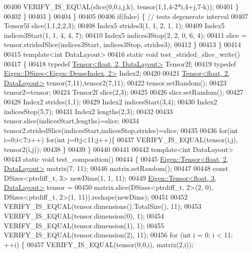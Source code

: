 \begin{DoxyCode}
00400           VERIFY\_IS\_EQUAL(slice(0,0,i,j,k), tensor(1,1,4-2*i,4+j,7-k));
00401         \}
00402       \}
00403     \}
00404   \}
00405 
00406   \textcolor{keywordflow}{if}(\textcolor{keyword}{false}) \{ \textcolor{comment}{// tests degenerate interval}
00407     Tensor5f slice(1,1,2,2,3);
00408     Index5 strides3(1, 1, 2, 1, 1);
00409     Index5 indices3Start(1, 1, 4, 4, 7);
00410     Index5 indices3Stop(2, 2, 0, 6, 4);
00411     slice = tensor.stridedSlice(indices3Start, indices3Stop, strides3);
00412   \}
00413 \}
00414 
00415 \textcolor{keyword}{template}<\textcolor{keywordtype}{int} DataLayout>
00416 \textcolor{keyword}{static} \textcolor{keywordtype}{void} test\_strided\_slice\_write()
00417 \{
00418   \textcolor{keyword}{typedef} \hyperlink{class_eigen_1_1_tensor}{Tensor<float, 2, DataLayout>} Tensor2f;
00419   \textcolor{keyword}{typedef} \hyperlink{struct_eigen_1_1_d_sizes}{Eigen::DSizes<Eigen::DenseIndex, 2>} Index2;
00420 
00421   \hyperlink{class_eigen_1_1_tensor}{Tensor<float, 2, DataLayout>} tensor(7,11),tensor2(7,11);
00422   tensor.setRandom();
00423   tensor2=tensor;
00424   Tensor2f slice(2,3);
00425 
00426   slice.setRandom();
00427 
00428   Index2 strides(1,1);
00429   Index2 indicesStart(3,4);
00430   Index2 indicesStop(5,7);
00431   Index2 lengths(2,3);
00432 
00433   tensor.slice(indicesStart,lengths)=slice;
00434   tensor2.stridedSlice(indicesStart,indicesStop,strides)=slice;
00435 
00436   \textcolor{keywordflow}{for}(\textcolor{keywordtype}{int} i=0;i<7;i++) \textcolor{keywordflow}{for}(\textcolor{keywordtype}{int} j=0;j<11;j++)\{
00437     VERIFY\_IS\_EQUAL(tensor(i,j), tensor2(i,j));
00438   \}
00439 \}
00440 
00441 
00442 \textcolor{keyword}{template}<\textcolor{keywordtype}{int} DataLayout>
00443 \textcolor{keyword}{static} \textcolor{keywordtype}{void} test\_composition()
00444 \{
00445   \hyperlink{class_eigen_1_1_tensor}{Eigen::Tensor<float, 2, DataLayout>} matrix(7, 11);
00446   matrix.setRandom();
00447 
00448   \textcolor{keyword}{const} DSizes<ptrdiff\_t, 3> newDims(1, 1, 11);
00449   \hyperlink{class_eigen_1_1_tensor}{Eigen::Tensor<float, 3, DataLayout>} tensor =
00450       matrix.slice(DSizes<ptrdiff\_t, 2>(2, 0), DSizes<ptrdiff\_t, 2>(1, 11)).reshape(newDims);
00451 
00452   VERIFY\_IS\_EQUAL(tensor.dimensions().TotalSize(), 11);
00453   VERIFY\_IS\_EQUAL(tensor.dimension(0), 1);
00454   VERIFY\_IS\_EQUAL(tensor.dimension(1), 1);
00455   VERIFY\_IS\_EQUAL(tensor.dimension(2), 11);
00456   \textcolor{keywordflow}{for} (\textcolor{keywordtype}{int} i = 0; i < 11; ++i) \{
00457     VERIFY\_IS\_EQUAL(tensor(0,0,i), matrix(2,i));

\end{DoxyCode}

